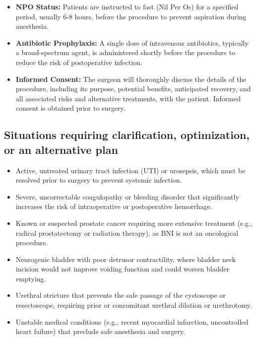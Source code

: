 \begin{itemize}
  \item \textbf{NPO Status:} Patients are instructed to fast (Nil Per Os) for a specified period, usually 6-8 hours, before the procedure to prevent aspiration during anesthesia.
  
  \item \textbf{Antibiotic Prophylaxis:} A single dose of intravenous antibiotics, typically a broad-spectrum agent, is administered shortly before the procedure to reduce the risk of postoperative infection.
  
  \item \textbf{Informed Consent:} The surgeon will thoroughly discuss the details of the procedure, including its purpose, potential benefits, anticipated recovery, and all associated risks and alternative treatments, with the patient. Informed consent is obtained prior to surgery.
\end{itemize}

\subsection*{Situations requiring clarification, optimization, or an alternative plan}
\begin{itemize}
  \item Active, untreated urinary tract infection (UTI) or urosepsis, which must be resolved prior to surgery to prevent systemic infection.
  \item Severe, uncorrectable coagulopathy or bleeding disorder that significantly increases the risk of intraoperative or postoperative hemorrhage.
  \item Known or suspected prostate cancer requiring more extensive treatment (e.g., radical prostatectomy or radiation therapy), as BNI is not an oncological procedure.
  \item Neurogenic bladder with poor detrusor contractility, where bladder neck incision would not improve voiding function and could worsen bladder emptying.
  \item Urethral stricture that prevents the safe passage of the cystoscope or resectoscope, requiring prior or concomitant urethral dilation or urethrotomy.
  \item Unstable medical conditions (e.g., recent myocardial infarction, uncontrolled heart failure) that preclude safe anesthesia and surgery.
\end{itemize}

